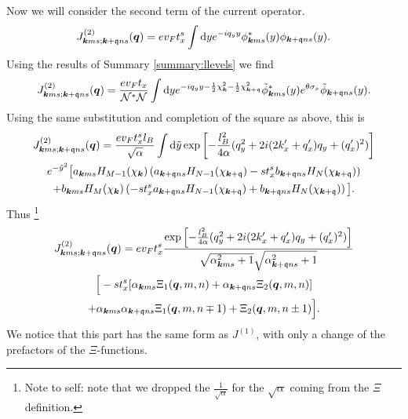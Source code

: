 Now we will consider the second term of the current operator.
\begin{equation}
  \label{eq:83}
  J_{\bm{k} m s; \bm{k} + \mathfrak{q} n s}^{(2)} (\bm{q}) =
  e v_{F} t^s_{x}
  \int \mathrm{d} y
  e^{-iq_{y} y}
  \phi ^{*}_{\bm{k} m s}(y)  \phi _{\bm{k} + \mathfrak{q} n s}(y).
\end{equation}
Using the results of Summary \ref{summary:llevels} we find
\begin{equation}
  \label{eq:84}
  J_{\bm{k} m s; \bm{k} + \mathfrak{q} n s}^{(2)} (\bm{q}) =
  \frac{e v_F t_x }{\mathcal{N}^{*} \mathcal{N}}
  \int \mathrm{d} y
  e^{-i q_{y} y - \frac{1}{2} \chi_{\bm{k}} ^2 - \frac{1}{2} \chi _{\bm{k} + \mathfrak{q}}^2}
  \tilde{\phi} ^{*}_{\bm{k} m s}(y) e^{\theta \sigma _{x}} \tilde{\phi} _{\bm{k} + \mathfrak{q} n s}(y).
\end{equation}
Using the same substitution and completion of the square as above, this is
\begin{multline}
  \label{eq:85}
  J_{\bm{k} m s; \bm{k} + \mathfrak{q} n s}^{(2)} (\bm{q}) =
  \frac{e v_F t^s_x l_{B}}{\sqrt{\alpha}}
  \int \mathrm{d} \tilde{y}
    \exp \left[
      -\frac{l_{B}^2}{4 \alpha } (q_{y}^2 + 2i (2 k'_x + q' _x) q_{y}  + (q'_x)^2 )
    \right]\\
  e^{-\tilde{y}^2} \big[
    a_{\bm{k} m s} H_{M-1}( \chi _{\bm{k}} ) \left(a_{\bm{k} + \mathfrak{q} n s} H_{N-1}( \chi _{\bm{k} + \mathfrak{q}} ) - s t^s_{x} b_{\bm{k} + \mathfrak{q} n s} H_{N}( \chi _{\bm{k} + \mathfrak{q}} ) \right)\\
   +
    b_{\bm{k} m s} H_{M}( \chi _{\bm{k}} ) \left(- s t^s_{x} a_{\bm{k} + \mathfrak{q} n s} H_{N-1}( \chi _{\bm{k} + \mathfrak{q}} ) + b_{\bm{k} + \mathfrak{q} n s} H_{N}( \chi _{\bm{k} + \mathfrak{q}} ) \right)
    \big].
\end{multline}
Thus
\footnote{Note to self: note that we dropped the \( \frac{1}{\sqrt{\alpha } } \) for the \( \sqrt{\alpha }  \) coming from the \( \Xi  \) definition.}
\begin{multline}
  J_{\bm{k} m s; \bm{k} + \mathfrak{q} n s}^{(2)} (\bm{q}) =
  e v_F t^s_x
  \frac{
    \exp \left[
      -\frac{l_{B}^2}{4 \alpha } (q_{y}^2 + 2i (2 k' _x + q' _x) q_{y} + (q'_x)^2 )
    \right]
  }{
    \sqrt{\alpha_{\bm{k} m s}^2 + 1} \sqrt{\alpha _{\bm{k}+\mathfrak{q} n s}^2 + 1}
  }\\
  \Big[
  -s t^s_x [ \alpha_{\bm{k} m s} \Xi_1(\bm{q}, m, n) + \alpha_{\bm{k} + \mathfrak{q} n s} \Xi_2(\bm{q}, m, n) ]\\
  + \alpha_{\bm{k} m s} \alpha_{\bm{k} + \mathfrak{q} ns} \Xi_1(\bm{q}, m, n\mp 1)
  + \Xi_2(\bm{q}, m, n \pm 1) \Big].
\end{multline}
We notice that this part has the same form as \( J^{(1)} \), with only a change of the prefactors of the \( \Xi  \)-functions.

